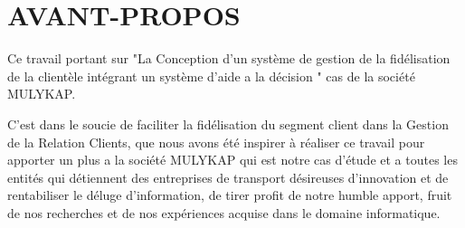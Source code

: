 \chapter*{AVANT-PROPOS}
Ce travail portant sur "La Conception d’un système de gestion de la fidélisation
de la clientèle intégrant un système d’aide a la décision
" cas de la société MULYKAP.
\newline

C’est dans le soucie de faciliter la fidélisation du segment client
dans la Gestion de la Relation Clients, que nous avons été inspirer
à réaliser ce travail pour apporter un plus a la société MULYKAP
qui est notre cas d’étude et a toutes les entités qui détiennent des entreprises
de transport désireuses d’innovation et de rentabiliser le 
déluge d’information, de tirer profit de notre humble apport, fruit
de nos recherches et de nos expériences acquise dans le domaine informatique.